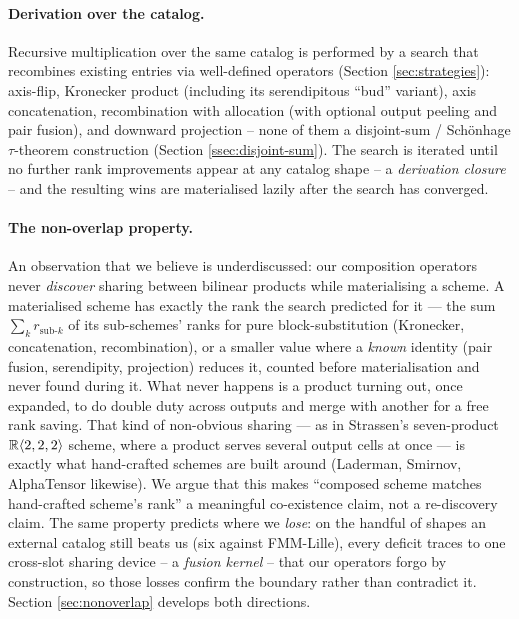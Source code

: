 \paragraph{Derivation over the catalog.} Recursive multiplication
over the same catalog is performed by a search that recombines
existing entries via well-defined operators (Section
\ref{sec:strategies}): axis-flip, Kronecker product (including its
serendipitous ``bud'' variant), axis concatenation, recombination with
allocation (with optional output peeling and pair fusion), and
downward projection -- none of them a disjoint-sum / Sch\"onhage
$\tau$-theorem construction (Section \ref{ssec:disjoint-sum}). The
search is iterated until no further rank improvements appear at any
catalog shape -- a \emph{derivation closure} -- and the resulting wins
are materialised lazily after the search has converged.

\paragraph{The non-overlap property.} An observation that we believe is
underdiscussed: our composition operators never \emph{discover} sharing
between bilinear products while materialising a scheme. A materialised
scheme has exactly the rank the search predicted for it --- the sum
\(\sum_k r_{\text{sub-}k}\) of its sub-schemes' ranks for pure
block-substitution (Kronecker, concatenation, recombination), or a
smaller value where a \emph{known} identity (pair fusion, serendipity,
projection) reduces it, counted before materialisation and never found
during it. What never happens is a product turning out, once expanded,
to do double duty across outputs and merge with another for a free rank
saving. That kind of non-obvious sharing --- as in Strassen's
seven-product \(\mathbb{R}\langle 2, 2, 2 \rangle\) scheme, where a product
serves several output cells at once --- is exactly what hand-crafted
schemes are built around (Laderman, Smirnov, AlphaTensor likewise). We
argue that this makes ``composed scheme matches hand-crafted scheme's
rank'' a meaningful co-existence claim, not a re-discovery claim. The same property
predicts where we \emph{lose}: on the handful of shapes an external
catalog still beats us (six against FMM-Lille), every deficit traces to
one cross-slot sharing device -- a \emph{fusion kernel} -- that our
operators forgo by construction, so those losses confirm the boundary
rather than contradict it. Section \ref{sec:nonoverlap} develops both
directions.

